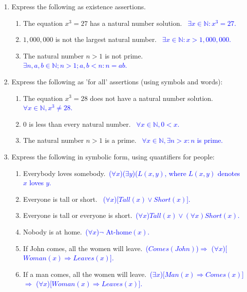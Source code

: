 \documentclass[13.5pt]{article}
\begin{document}
\begin{enumerate}

\item{Express the following as existence assertions.}

\begin{enumerate}
\setlength{\itemindent}{.1in}
\item{The equation \(x^3=27\) has a natural number solution.}\
\textcolor{blue} { \( \exists x \in \mathbb{N}: x^3=27\). }
\item{\(1,000,000\) is not the largest natural number.}\
\textcolor{blue} { \( \exists x \in \mathbb{N}: x>1,000,000\). }
\item{The natural number \( n>1\) is not prime}.\
\textcolor{blue} { \( \exists n,a,b \in \mathbb{N};  n>1; a,b<n: n=ab\). }

\end{enumerate}


\item{ Express the following as 'for all' assertions (using symbols and words):}

\begin{enumerate}
\setlength{\itemindent}{.1in}
\item{The equation \(x^3=28\) does not have a natural number solution.}\
\textcolor{blue} { \(\forall x \in \mathbb{N}, x^3\neq28\). }
\item{\(0\) is less than every natural number.}\
\textcolor{blue} { \(\forall x \in \mathbb{N}, 0<x\). }
\item{The natural number \( n>1\) is a prime}.\
\textcolor{blue} { \(\forall x \in \mathbb{N}, \exists n>x: n\) is prime. }
\end{enumerate}

\item{Express the following in symbolic form, using quantifiers for people:}
\begin{enumerate}
\setlength{\itemindent}{.1in}
\item{Everybody loves somebody.}\
\textcolor{blue} {(\(\forall x\))(\(\exists y\))(\(L(x,y)\), where \(L(x,y)\) denotes \(x\) loves \(y\). }
\item{Everyone is tall or short.}\
\textcolor{blue} { (\(\forall x\))[\(Tall(x) \vee Short(x)\)]. }
\item{Everyone is tall or everyone is short.}\
\textcolor{blue} {(\(\forall x\))\(Tall(x) \vee (\forall x)Short(x)\). }
\item{Nobody is at home.}\
\textcolor{blue} {(\(\forall x\))\(\neg\) At-home\((x)\). }
\item{If John comes, all the women will leave.}\
\textcolor{blue} {(\(Comes(John)\))\(\Rightarrow\) (\(\forall x\))[\(Woman(x) \Rightarrow Leaves(x)\)]. }
\item{If a man comes, all the women will leave.}\
\textcolor{blue} {(\( \exists x\))[\(Man(x) \Rightarrow Comes(x)\)]\(\Rightarrow\) (\(\forall x\))[\(Woman(x) \Rightarrow Leaves(x)\)]. }
\end{enumerate}


\end{enumerate}
\end{document}
